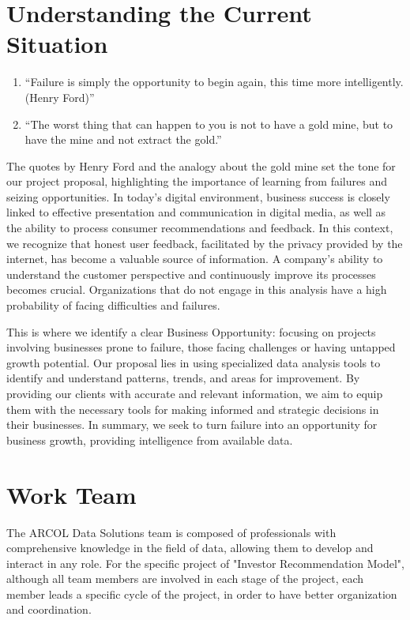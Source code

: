 \documentclass[12pt]{article}
\begin{document}
\section{Understanding the Current Situation}
\begin{enumerate}
    \item “Failure is simply the opportunity to begin again, this time more intelligently. (Henry Ford)”
    \item “The worst thing that can happen to you is not to have a gold mine, but to have the mine and not extract the gold.”
\end{enumerate}
The quotes by Henry Ford and the analogy about the gold mine set the tone for our project proposal, highlighting the importance of learning from failures and seizing opportunities. In today's digital environment, business success is closely linked to effective presentation and communication in digital media, as well as the ability to process consumer recommendations and feedback. In this context, we recognize that honest user feedback, facilitated by the privacy provided by the internet, has become a valuable source of information. A company's ability to understand the customer perspective and continuously improve its processes becomes crucial. Organizations that do not engage in this analysis have a high probability of facing difficulties and failures.

This is where we identify a clear Business Opportunity: focusing on projects involving businesses prone to failure, those facing challenges or having untapped growth potential. Our proposal lies in using specialized data analysis tools to identify and understand patterns, trends, and areas for improvement. By providing our clients with accurate and relevant information, we aim to equip them with the necessary tools for making informed and strategic decisions in their businesses. In summary, we seek to turn failure into an opportunity for business growth, providing intelligence from available data.

\section{Work Team}

The ARCOL Data Solutions team is composed of professionals with comprehensive knowledge in the field of data, allowing them to develop and interact in any role. For the specific project of "Investor Recommendation Model", although all team members are involved in each stage of the project, each member leads a specific cycle of the project, in order to have better organization and coordination.
\end{document}
